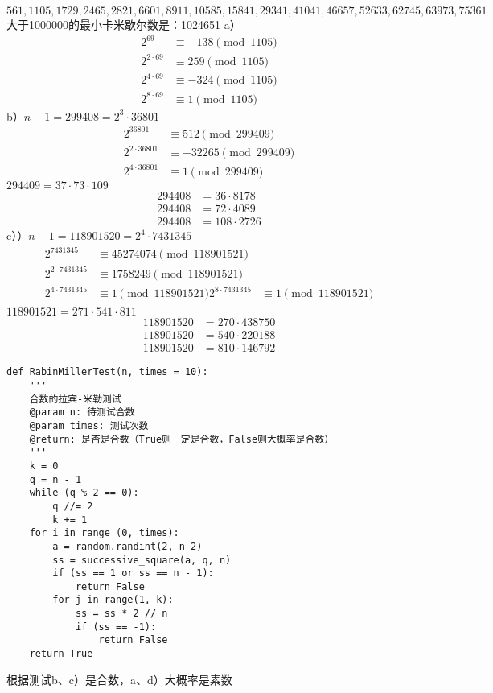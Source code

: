 \[561, 1105, 1729, 2465, 2821, 6601, 8911, 10585, 15841, 29341, 41041, 46657, 52633, 62745, 63973, 75361\]
大于1000000的最小卡米歇尔数是：1024651
%
\exercise a）
\begin{align*}
2^{69}&\equiv -138\pmod{1105} \\
2^{2\cdot69}&\equiv 259\pmod{1105} \\
2^{4\cdot69}&\equiv -324\pmod{1105} \\
2^{8\cdot69}&\equiv 1\pmod{1105}
\end{align*}
b）$n-1=299408=2^3\cdot36801$
\begin{align*}
2^{36801}&\equiv 512\pmod{299409} \\
2^{2\cdot36801}&\equiv -32265\pmod{299409} \\
2^{4\cdot36801}&\equiv 1\pmod{299409}
\end{align*}
$294409=37\cdot73\cdot109$
\begin{align*}
    294408&=36\cdot8178 \\
    294408&=72\cdot4089 \\
    294408&=108\cdot2726
\end{align*}
c））$n-1=118901520=2^4\cdot7431345$
\begin{align*}
2^{7431345}&\equiv 45274074\pmod{118901521} \\
2^{2\cdot7431345}&\equiv 1758249\pmod{118901521} \\
2^{4\cdot7431345}&\equiv 1\pmod{118901521} 
2^{8\cdot7431345}&\equiv 1\pmod{118901521} \\
\end{align*}
$118901521=271\cdot541\cdot811$
\begin{align*}
    118901520&=270\cdot 438750 \\
    118901520&=540\cdot 220188 \\
    118901520&=810\cdot 146792
\end{align*}
%
\exercise 
\begin{lstlisting}
def RabinMillerTest(n, times = 10):
    '''
    合数的拉宾-米勒测试
    @param n: 待测试合数
    @param times: 测试次数
    @return: 是否是合数（True则一定是合数，False则大概率是合数）
    '''
    k = 0
    q = n - 1
    while (q % 2 == 0):
        q //= 2
        k += 1
    for i in range (0, times):
        a = random.randint(2, n-2)
        ss = successive_square(a, q, n)
        if (ss == 1 or ss == n - 1): 
            return False
        for j in range(1, k):
            ss = ss * 2 // n
            if (ss == -1):
                return False
    return True
\end{lstlisting}
根据测试b、c）是合数，a、d）大概率是素数